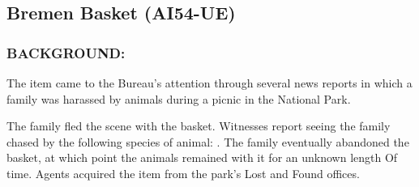 \subsection*{Bremen Basket (AI54-UE)}
\subsubsection*{BACKGROUND:}
\par The item came to the Bureau's attention through several news
reports in which a family was harassed by animals during a picnic
in the  National Park.
\par The family fled the scene with the basket. Witnesses report
seeing the family chased by the following species of animal:   . The family eventually abandoned the
basket, at which point the animals remained with it for an
unknown length Of time. Agents acquired the item from the park's
Lost and Found offices.
